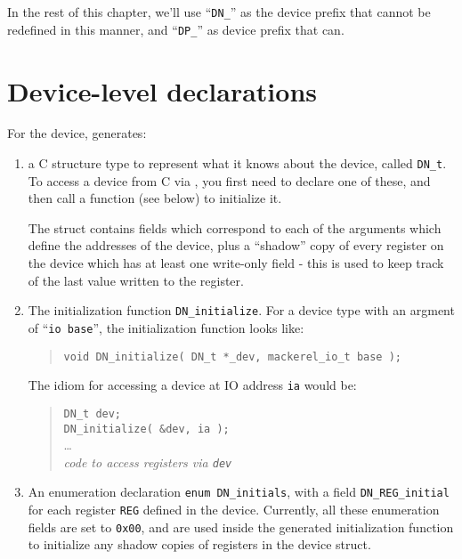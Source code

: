 \documentclass[a4paper,11pt,twoside]{report}
\begin{document}
In the rest of this chapter, we'll use ``\texttt{DN\_}'' as the
device prefix that cannot be redefined in this manner, and ``\texttt{DP\_}''
as device prefix that can. 

\section{Device-level declarations}

For the device, \Mac generates: 

\begin{enumerate}

\item a C structure type to represent what it knows about the
  device, called \texttt{DN\_t}.  To access a device from C via \Mac,
  you first need to declare one of these, and then call a function
  (see below) to initialize it. 
  
  The struct contains fields which correspond to each of the arguments
  which define the addresses of the device, plus a ``shadow'' copy of
  every register on the device which has at least one write-only field -
  this is used to keep track of the last value written to the register. 

\item The initialization function \texttt{DN\_initialize}.  For a
  device type with an argment of ``\texttt{io base}'', the
  initialization function looks like:

  \begin{quote}
    \texttt{void DN\_initialize( DN\_t *\_dev, mackerel\_io\_t base );}
  \end{quote}
  
  The idiom for accessing a device at IO address \texttt{ia} would be:
  
  \begin{quote}
    \texttt{DN\_t dev;}\\
    \texttt{DN\_initialize( \&dev, ia );}\\
    \ldots\\
    \textit{code to access registers via \texttt{dev}}
  \end{quote}

\item An enumeration declaration \texttt{enum
  DN\_initials}, with a field \texttt{DN\_REG\_initial} for each
  register \texttt{REG} defined in the device.  Currently, all these
  enumeration fields are set to \texttt{0x00}, and are used inside the
  generated initialization function to initialize any shadow copies of
  registers in the device struct.  
  

\end{enumerate}
\end{document}
